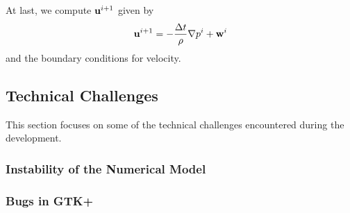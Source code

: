 \documentclass{article}
\begin{document}
At last, we compute $\mathbf u^{i+1}$ given by
\begin{align*}
	\mathbf u^{i+1}=-\frac{\Delta t}\rho\nabla p^i+\mathbf w^i
\end{align*}
and the boundary conditions for velocity.

\subsection{Technical Challenges}
This section focuses on some of the technical challenges encountered during the development.
\subsubsection{Instability of the Numerical Model}
\subsubsection{Bugs in GTK+}
\end{document}
